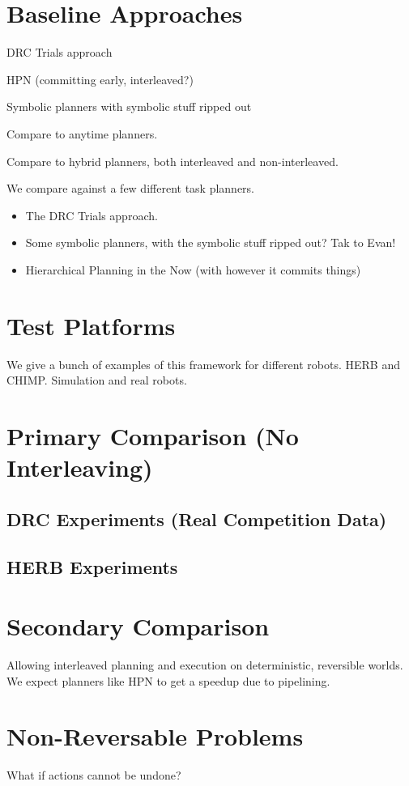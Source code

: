 \section{Baseline Approaches}


DRC Trials approach

HPN (committing early, interleaved?)

Symbolic planners with symbolic stuff ripped out

Compare to anytime planners.

Compare to hybrid planners,
both interleaved and non-interleaved.

We compare against a few different task planners.

\begin{itemize}
\item The DRC Trials approach.
\item Some symbolic planners, with the symbolic stuff ripped out?
   Tak to Evan!
\item Hierarchical Planning in the Now (with however it commits things)
\end{itemize}

\section{Test Platforms}

We give a bunch of examples of this framework
for different robots.
HERB and CHIMP.
Simulation and real robots.


\section{Primary Comparison (No Interleaving)}

\subsection{DRC Experiments (Real Competition Data)}

\subsection{HERB Experiments}

\section{Secondary Comparison}

Allowing interleaved planning and execution
on deterministic, reversible worlds.
We expect planners like HPN to get a speedup
due to pipelining.

\section{Non-Reversable Problems}

What if actions cannot be undone?
